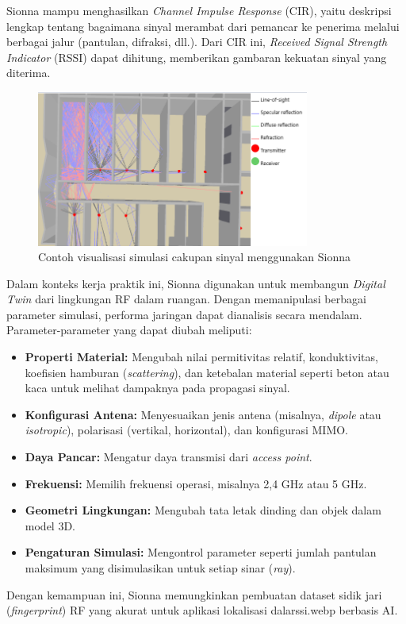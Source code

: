 Sionna mampu menghasilkan \textit{Channel Impulse Response} (CIR), yaitu deskripsi lengkap tentang bagaimana sinyal merambat dari pemancar ke penerima melalui berbagai jalur (pantulan, difraksi, dll.). Dari CIR ini, \textit{Received Signal Strength Indicator} (RSSI) dapat dihitung, memberikan gambaran kekuatan sinyal yang diterima.

\begin{figure}[htbp]
    \centering
    \includegraphics[width=0.8\textwidth]{assets/pics/sionna-simulation.png}
    \caption{Contoh visualisasi simulasi cakupan sinyal menggunakan Sionna}
    \label{fig:sionna_simulation}
\end{figure}

Dalam konteks kerja praktik ini, Sionna digunakan untuk membangun \textit{Digital Twin} dari lingkungan RF dalam ruangan. Dengan memanipulasi berbagai parameter simulasi, performa jaringan dapat dianalisis secara mendalam. Parameter-parameter yang dapat diubah meliputi:
\begin{itemize}
    \item \textbf{Properti Material:} Mengubah nilai permitivitas relatif, konduktivitas, koefisien hamburan (\textit{scattering}), dan ketebalan material seperti beton atau kaca untuk melihat dampaknya pada propagasi sinyal.
    \item \textbf{Konfigurasi Antena:} Menyesuaikan jenis antena (misalnya, \textit{dipole} atau \textit{isotropic}), polarisasi (vertikal, horizontal), dan konfigurasi MIMO.
    \item \textbf{Daya Pancar:} Mengatur daya transmisi dari \textit{access point}.
    \item \textbf{Frekuensi:} Memilih frekuensi operasi, misalnya 2,4 GHz atau 5 GHz.
    \item \textbf{Geometri Lingkungan:} Mengubah tata letak dinding dan objek dalam model 3D.
    \item \textbf{Pengaturan Simulasi:} Mengontrol parameter seperti jumlah pantulan maksimum yang disimulasikan untuk setiap sinar (\textit{ray}).
\end{itemize}
Dengan kemampuan ini, Sionna memungkinkan pembuatan dataset sidik jari (\textit{fingerprint}) RF yang akurat untuk aplikasi lokalisasi dalarssi.webp berbasis AI.
